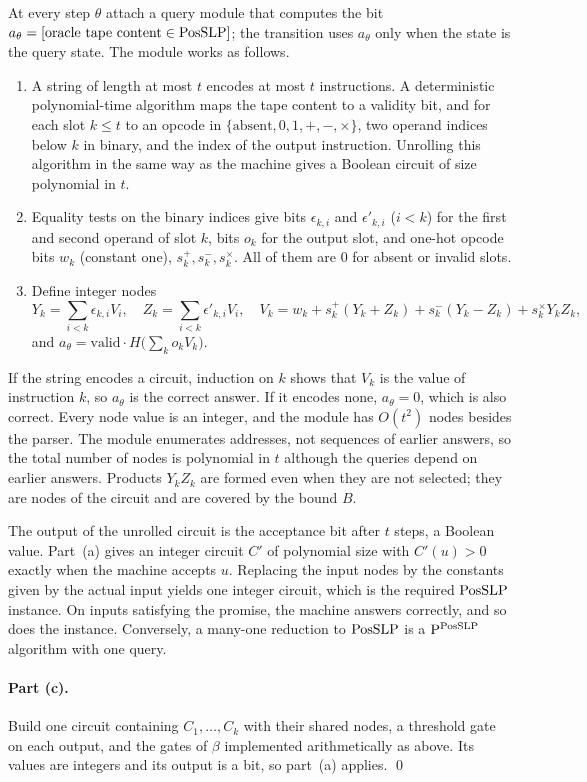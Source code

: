 At every step $\theta$ attach a query module that computes the bit
$a_\theta=[\text{oracle tape content}\in\mathrm{PosSLP}]$; the transition uses
$a_\theta$ only when the state is the query state. The module works as
follows.
\begin{enumerate}[label=(\roman*)]
\item A string of length at most $t$ encodes at most $t$ instructions. A
deterministic polynomial-time algorithm maps the tape content to a validity
bit, and for each slot $k\le t$ to an opcode in
$\{\text{absent},0,1,+,-,\times\}$, two operand indices below $k$ in binary,
and the index of the output instruction. Unrolling this algorithm in the same
way as the machine gives a Boolean circuit of size polynomial in $t$.
\item Equality tests on the binary indices give bits $\epsilon_{k,i}$ and
$\epsilon'_{k,i}$ ($i<k$) for the first and second operand of slot $k$, bits
$o_k$ for the output slot, and one-hot opcode bits
$w_k$ (constant one), $s^+_k,s^-_k,s^\times_k$. All of them are $0$ for absent
or invalid slots.
\item Define integer nodes
\[
 Y_k=\sum_{i<k}\epsilon_{k,i}V_i,\quad Z_k=\sum_{i<k}\epsilon'_{k,i}V_i,\quad
 V_k=w_k+s^+_k(Y_k+Z_k)+s^-_k(Y_k-Z_k)+s^\times_kY_kZ_k ,
\]
and $a_\theta=\text{valid}\cdot H\bigl(\sum_ko_kV_k\bigr)$.
\end{enumerate}
If the string encodes a circuit, induction on $k$ shows that $V_k$ is the
value of instruction $k$, so $a_\theta$ is the correct answer. If it encodes
none, $a_\theta=0$, which is also correct. Every node value is an integer, and
the module has $O(t^2)$ nodes besides the parser. The module enumerates
addresses, not sequences of earlier answers, so the total number of nodes is
polynomial in $t$ although the queries depend on earlier answers. Products
$Y_kZ_k$ are formed even when they are not selected; they are nodes of the
circuit and are covered by the bound $B$.

The output of the unrolled circuit is the acceptance bit after $t$ steps, a
Boolean value. Part~(a) gives an integer circuit $C'$ of polynomial size with
$C'(u)>0$ exactly when the machine accepts $u$. Replacing the input nodes by
the constants given by the actual input yields one integer circuit, which is
the required $\mathrm{PosSLP}$ instance. On inputs satisfying the promise, the
machine answers correctly, and so does the instance. Conversely, a many-one
reduction to $\mathrm{PosSLP}$ is a $\mathrm P^{\mathrm{PosSLP}}$ algorithm with one query.

\paragraph{Part (c).}
Build one circuit containing $C_1,\ldots,C_k$ with their shared nodes, a
threshold gate on each output, and the gates of $\beta$ implemented
arithmetically as above. Its values are integers and its output is a bit, so
part~(a) applies. \qed
